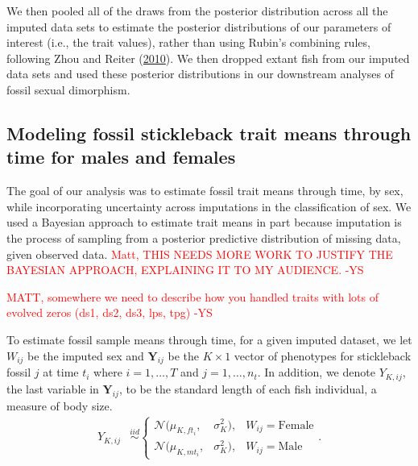 \documentclass[
  12pt,
]{article}
\begin{document}
We then pooled all of the draws from the posterior distribution across
all the imputed data sets to estimate the posterior distributions of our
parameters of interest (i.e., the trait values), rather than using
Rubin's combining rules, following Zhou and Reiter
(\protect\hyperlink{ref-ZhouReiter2010}{2010}). We then dropped extant
fish from our imputed data sets and used these posterior distributions
in our downstream analyses of fossil sexual dimorphism.

\hypertarget{modeling-fossil-stickleback-trait-means-through-time-for-males-and-females}{%
\subsection{Modeling fossil stickleback trait means through time for
males and
females}\label{modeling-fossil-stickleback-trait-means-through-time-for-males-and-females}}

The goal of our analysis was to estimate fossil trait means through
time, by sex, while incorporating uncertainty across imputations in the
classification of sex. We used a Bayesian approach to estimate trait
means in part because imputation is the process of sampling from a
posterior predictive distribution of missing data, given observed data.
\textcolor{red}{Matt, THIS NEEDS MORE WORK TO JUSTIFY THE BAYESIAN APPROACH, EXPLAINING IT TO MY AUDIENCE. -YS}

\textcolor{red}{MATT, somewhere we need to describe how you handled traits with lots of evolved zeros (ds1, ds2, ds3, lps, tpg) -YS}

To estimate fossil sample means through time, for a given imputed
dataset, we let \(W_{ij}\) be the imputed sex and
\(\boldsymbol{Y}_{ij}\) be the \(K \times 1\) vector of phenotypes for
stickleback fossil \(j\) at time \(t_i\) where \(i = 1, \ldots, T\) and
\(j = 1,\ldots,n_{t}\). In addition, we denote \(Y_{K,ij}\), the last
variable in \(\boldsymbol{Y}_{ij}\), to be the standard length of each
fish individual, a measure of body size. \begin{align}
{Y}_{K,ij} & \overset{iid}{\sim}\left\{\begin{array}{lll} \mathcal{N}(\mu_{K,ft_i},&\sigma_{K}^2), & W_{ij} = \text{Female} \\ \mathcal{N}(\mu_{K,mt_i},&\sigma_{K}^2), & W_{ij} = \text{Male} \end{array}\right..
\label{eq:stl}
\end{align}
\end{document}

